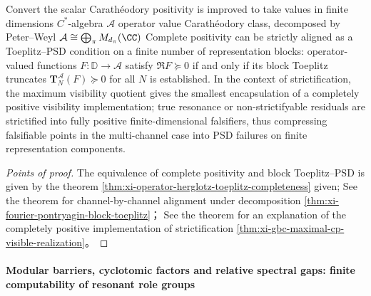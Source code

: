 \begin{conclusion}\label{con:xi-operator-valued-horizon-cp-falsifier}
Convert the scalar Carath\'eodory positivity is improved to take values ​​in finite dimensions \(C^\ast\)-algebra \(\mathcal{A}\) operator value Carath\'eodory class, decomposed by Peter--Weyl
\(
\mathcal{A}\cong\bigoplus_{\pi}M_{d_\pi}(\CC)
\)
Complete positivity can be strictly aligned as a Toeplitz--PSD condition on a finite number of representation blocks: operator-valued functions \(F:\mathbb{D}\to\mathcal{A}\) satisfy \(\Re F\succeq 0\) if and only if its block Toeplitz truncates \(\mathbf{T}^{\mathcal{A}}_N(F)\succeq 0\) for all \(N\) is established.
In the context of strictification, the maximum visibility quotient gives the smallest encapsulation of a completely positive visibility implementation; true resonance or non-strictifyable residuals are strictified into fully positive finite-dimensional falsifiers, thus compressing falsifiable points in the multi-channel case into PSD failures on finite representation components.
\end{conclusion}
\begin{proof}[Points of proof]
The equivalence of complete positivity and block Toeplitz--PSD is given by the theorem \ref{thm:xi-operator-herglotz-toeplitz-completeness} given;
See the theorem for channel-by-channel alignment under decomposition \ref{thm:xi-fourier-pontryagin-block-toeplitz}；
See the theorem for an explanation of the completely positive implementation of strictification \ref{thm:xi-gbc-maximal-cp-visible-realization}。
\end{proof}

\paragraph{Modular barriers, cyclotomic factors and relative spectral gaps: finite computability of resonant role groups}

